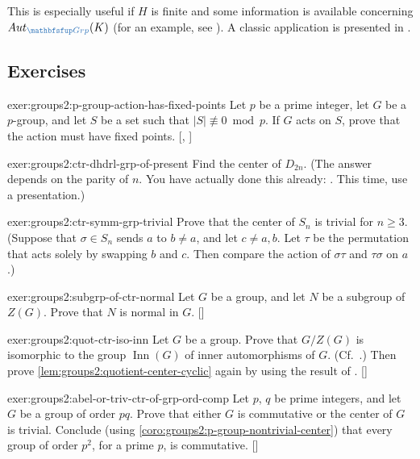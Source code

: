 This is especially useful if $H$ is finite and some information is
available concerning $\Aut_{\categ{Grp}}(K)$ (for an example, see
). A classic application is
presented in .

\subsection*{Exercises}

\begin{exer}{}{exer:groups2:p-group-action-has-fixed-points}
  \exerused{} Let $p$ be a prime integer, let $G$ be a $p$-group, and
  let $S$ be a set such that $|S| \not\equiv 0 \bmod p$. If $G$ acts
  on $S$, prove that the action must have fixed
  points. [,
  ]
\end{exer}
\begin{exer}{}{exer:groups2:ctr-dhdrl-grp-of-present}
  Find the center of $D_{2n}$. (The answer depends on the parity of
  $n$. You have actually done this already:
  . This time, use a presentation.)
\end{exer}
\begin{exer}{}{exer:groups2:ctr-symm-grp-trivial}
  Prove that the center of $S_n$ is trivial for $n \geq 3$. (Suppose
  that $\sigma \in S_n$ sends $a$ to $b \neq a$, and let
  $c \neq a, b$. Let $\tau$ be the permutation that acts solely by
  swapping $b$ and $c$. Then compare the action of $\sigma\tau$ and
  $\tau\sigma$ on $a$.)
\end{exer}
\begin{exer}{}{exer:groups2:subgrp-of-ctr-normal}
  \exerused{} Let $G$ be a group, and let $N$ be a subgroup of
  $Z(G)$. Prove that $N$ is normal in $G$. []
\end{exer}
\begin{exer}{}{exer:groups2:quot-ctr-iso-inn}
  \exerused{} Let $G$ be a group. Prove that $G/Z(G)$ is isomorphic to
  the group $\operatorname{Inn}(G)$ of inner automorphisms of
  $G$. (Cf.\ .) Then prove
  \cref{lem:groups2:quotient-center-cyclic} again by using the result
  of
  . []
\end{exer}
\begin{exer}{}{exer:groups2:abel-or-triv-ctr-of-grp-ord-comp}
  \exerused{} Let $p$, $q$ be prime integers, and let $G$ be a group
  of order $pq$. Prove that either $G$ is commutative or the center of
  $G$ is trivial.  Conclude (using
  \cref{coro:groups2:p-group-nontrivial-center}) that every group of
  order $p^2$, for a prime $p$, is commutative. []
\end{exer}

